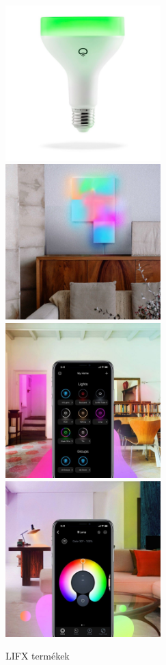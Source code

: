 \documentclass[../main.tex]{subfiles}
\begin{document}
            \begin{figure}[h!] %
                \centering
                    \includegraphics[height=6cm]{irodalom_res/LIFX_bulb}
                    \includegraphics[height=6cm]{irodalom_res/LIFX_tile}
                    \includegraphics[height=6cm]{irodalom_res/LIFX_app1}
                    \includegraphics[height=6cm]{irodalom_res/LIFX_app2}
                \caption{LIFX termékek}
                \label{fig:lifx}
             \end{figure}
        
\end{document}

